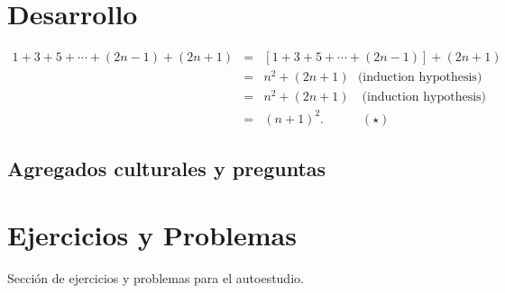 \section{Desarrollo}

\begin{figure}[htb]
    \centering
    
\end{figure}

\begin{eqnarray*}
    1+3+5+\cdots+(2n-1) + (2n+1) & = & \left[1+3+5+\cdots+(2n-1)\right]+(2n+1) \\
    & = & n^2 + (2n+1)~~~\mbox{(induction hypothesis)} \\
    & = & n^2 + (2n+1)\quad \text{(induction hypothesis)} \\
    & = & (n+1)^2. \quad\qquad (\star)
\end{eqnarray*}

\subsection{Agregados culturales y preguntas}
{

}

\section{Ejercicios y Problemas}
{
    Sección de ejercicios y problemas para el autoestudio.
}
